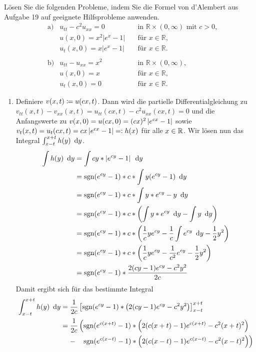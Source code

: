 \begin{exercisePage}
	
\begin{task}
	Lösen Sie die folgenden Probleme, indem Sie die Formel von d'Alembert aus Aufgabe 19 auf geeignete Hilfsprobleme anwenden.
	\begin{align*}
		&\text{a)}&
		u_{tt} - c^2u_{xx} = 0           &\quad  \text{in } \mathbb R \times (0,\infty) \text{ mit }c>0, \\
		&&u(x,0) 	           = x^2 |e^x-1| &\quad \text{für } x\in \mathbb R, \\
		&&u_t(x,0) 	   = x |e^x-1|   &\quad \text{für } x\in \mathbb R.\\
		&&&~\\
		&\text{b)}&
		u_{tt} - u_{xx} = x^2  &\quad \text{in } \mathbb R \times (0,\infty),\\
		&&u(x,0)          = x    &\quad \text{für } x\in \mathbb R, \\
		&&u_t(x,0)        = 0    &\quad \text{für } x\in \mathbb R.
	\end{align*}
\end{task}

\begin{enumerate}[label=(zu \alph*), leftmargin=*]
	\item Definiere $v(x,t) \coloneqq u(cx,t)$. Dann wird die partielle Differentialgleichung zu $v_{tt}(x,t) - v_{xx}(x,t) = u_{tt}(cx,t) - c^2 u_{xx}(cx,t) = 0$ und die Anfangswerte zu $v(x,0) = u(cx,0) = (cx)^2 \left| e^{cx} - 1 \right|$ sowie $v_t(x,t) = u_t(cx,t) = cx \left| e^{cx} - 1 \right| \mathrel{=:} h(x)$ für alle $x \in \mathbb{R}$.
	Wir lösen nun das Integral $\int_{x-t}^{x+t} h(y) \enskip \mathrm{d}y$.
	\begin{align*}
		\int h(y) \enskip \mathrm{d}y 
		&= \int cy * \left| e^{cy} - 1 \right| \enskip \mathrm{d}y \\
		&= \operatorname{sgn}(e^{cy} - 1) * c * \int y (e^{cy} - 1) \enskip \mathrm{d}y \\
		&= \operatorname{sgn}(e^{cy} - 1) * c * \int y * e^{cy} - y \enskip \mathrm{d}y \\
		&= \operatorname{sgn}(e^{cy} - 1) * c * \left( \int y * e^{cy} \enskip \mathrm{d}y - \int y \enskip \mathrm{d}y \right) \\
		&= \operatorname{sgn}(e^{cy} - 1) * c * \left( \frac{1}{c} y e^{cy} - \frac{1}{c} \int e^{cy} \enskip \mathrm{d}y - \frac{1}{2} y^2 \right) \\
		&= \operatorname{sgn}(e^{cy} - 1) * c * \left( \frac{1}{c} y e^{cy} - \frac{1}{c^2} e^{cy} - \frac{1}{2} y^2 \right) \\
		&= \operatorname{sgn}(e^{cy} - 1) * \frac{2 (cy - 1) e^{cy} - c^2y^2}{2c}
	\end{align*}
	Damit ergibt sich für das bestimmte Integral
	\begin{align*}
		\int_{x-t}^{x+t} h(y) \enskip \mathrm{d}y
		&= \frac{1}{2c}\left[ \operatorname{sgn}(e^{cy} - 1) * \left( 2 (cy - 1) e^{cy} - c^2y^2 \right) \right]_{x-t}^{x+t} \\
		&= \frac{1}{2c} \left(\operatorname{sgn}(e^{c(x+t)} - 1) * \left( 2 (c(x+t) - 1) e^{c(x+t)} - c^2(x+t)^2 \right) \right. \\
		&\phantom{= } \ - \enskip \ \left. \operatorname{sgn}(e^{c(x-t)} - 1) * \left( 2 (c(x-t) - 1) e^{c(x-t)} - c^2(x-t)^2 \right)\right)
	\end{align*}
	

\end{enumerate}
\end{exercisePage}

